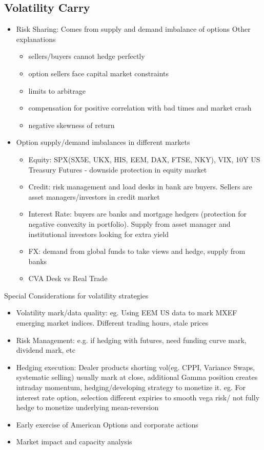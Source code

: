 \documentclass[11pt, openany]{book}              %
\begin{document}
\subsection{Volatility Carry}
\begin{itemize}
	\item Risk Sharing: Comes from supply and demand imbalance of options
	\subitem Other explanations
		\begin{itemize}
		 \item sellers/buyers cannot hedge perfectly
		 \item option sellers face capital market constraints
		 \item limits to arbitrage
		 \item compensation for positive correlation with bad times and market crash
		 \item negative skewness of return
		\end{itemize}
	  \item Option supply/demand imbalances in different markets
	  \subitem
	  \begin{itemize}
	  	\item Equity: SPX(SX5E, UKX, HIS, EEM, DAX, FTSE, NKY), VIX, 10Y US Treasury Futures - downside protection in equity market
	  	\item Credit: risk management and load desks in bank are buyers. Sellers are asset managers/investors in credit market
		\item Interest Rate: buyers are banks and mortgage hedgers (protection for negative convexity in portfolio). Supply from asset manager and institutional investors looking for extra yield
		\item FX: demand from global funds to take views and hedge, supply from banks
		\item CVA Desk vs Real Trade
	  \end{itemize}
\end{itemize}

Special Considerations for volatility strategies

\begin{itemize}
	\item Volatility mark/data quality: eg. Using EEM US data to mark MXEF emerging market indices. Different trading hours, stale prices
	\item Risk Management: e.g. if hedging with futures, need funding curve mark, dividend mark, etc
	\item Hedging execution: Dealer products shorting vol(eg. CPPI, Variance Swaps, systematic selling) usually mark at close, additional Gamma position creates intraday momentum, hedging/developing strategy to monetize it. eg. For interest rate option, selection different expiries to smooth vega risk/ not fully hedge to monetize underlying mean-reversion
	\item Early exercise of American Options and corporate actions
	\item Market impact and capacity analysis
\end{itemize}
\end{document}
